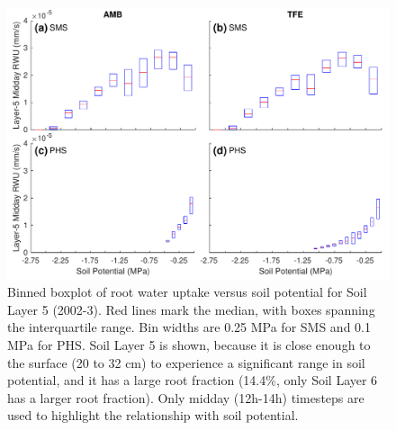 \documentclass[draft]{agujournal}
\begin{document}
  \begin{figure}[h]
     \centering
     \includegraphics[width=30pc]{figs/rwu.pdf}
     \caption{Binned boxplot of root water uptake versus soil potential for Soil Layer 5 (2002-3).
     Red lines mark the median, with boxes spanning the interquartile range.
     Bin widths are 0.25 MPa for SMS and 0.1 MPa for PHS.
     Soil Layer 5 is shown, because it is close enough to the surface (20 to 32 cm) to experience a significant range in soil potential, and it has a large root fraction (14.4\%, only Soil Layer 6 has a larger root fraction).
     Only midday (12h-14h) timesteps are used to highlight the relationship with soil potential.}
     \label{fig:rwu}
  \end{figure}
  \clearpage
  
\end{document}
